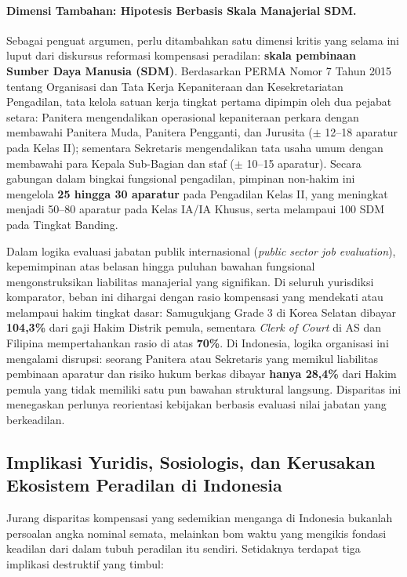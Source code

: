 \documentclass[12pt, a4paper]{article}
\begin{document}
\paragraph{Dimensi Tambahan: Hipotesis Berbasis Skala Manajerial SDM.} Sebagai penguat argumen, perlu ditambahkan satu dimensi kritis yang selama ini luput dari diskursus reformasi kompensasi peradilan: \textbf{skala pembinaan Sumber Daya Manusia (SDM)}. Berdasarkan PERMA Nomor 7 Tahun 2015 tentang Organisasi dan Tata Kerja Kepaniteraan dan Kesekretariatan Pengadilan, tata kelola satuan kerja tingkat pertama dipimpin oleh dua pejabat setara: Panitera mengendalikan operasional kepaniteraan perkara dengan membawahi Panitera Muda, Panitera Pengganti, dan Jurusita ($\pm$ 12--18 aparatur pada Kelas II); sementara Sekretaris mengendalikan tata usaha umum dengan membawahi para Kepala Sub-Bagian dan staf ($\pm$ 10--15 aparatur). Secara gabungan dalam bingkai fungsional pengadilan, pimpinan non-hakim ini mengelola \textbf{25 hingga 30 aparatur} pada Pengadilan Kelas II, yang meningkat menjadi 50--80 aparatur pada Kelas IA/IA Khusus, serta melampaui 100 SDM pada Tingkat Banding.

Dalam logika evaluasi jabatan publik internasional (\textit{public sector job evaluation}), kepemimpinan atas belasan hingga puluhan bawahan fungsional mengonstruksikan liabilitas manajerial yang signifikan. Di seluruh yurisdiksi komparator, beban ini dihargai dengan rasio kompensasi yang mendekati atau melampaui hakim tingkat dasar: Samugukjang Grade 3 di Korea Selatan dibayar \textbf{104,3\%} dari gaji Hakim Distrik pemula, sementara \textit{Clerk of Court} di AS dan Filipina mempertahankan rasio di atas \textbf{70\%}. Di Indonesia, logika organisasi ini mengalami disrupsi: seorang Panitera atau Sekretaris yang memikul liabilitas pembinaan aparatur dan risiko hukum berkas dibayar \textbf{hanya 28,4\%} dari Hakim pemula yang tidak memiliki satu pun bawahan struktural langsung. Disparitas ini menegaskan perlunya reorientasi kebijakan berbasis evaluasi nilai jabatan yang berkeadilan.

\subsection{Implikasi Yuridis, Sosiologis, dan Kerusakan Ekosistem Peradilan di Indonesia}

Jurang disparitas kompensasi yang sedemikian menganga di Indonesia bukanlah persoalan angka nominal semata, melainkan bom waktu yang mengikis fondasi keadilan dari dalam tubuh peradilan itu sendiri. Setidaknya terdapat tiga implikasi destruktif yang timbul:
\end{document}
